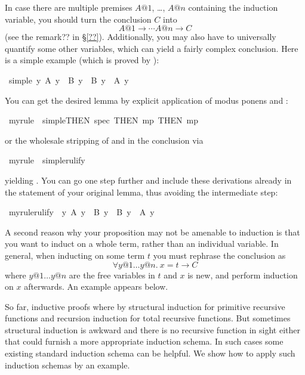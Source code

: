 \begin{isabelle}
\begin{isamarkuptext}
In case there are multiple premises $A@1$, \dots, $A@n$ containing the
induction variable, you should turn the conclusion $C$ into
\[ A@1 \longrightarrow \cdots A@n \longrightarrow C \]
(see the remark?? in \S\ref{??}).
Additionally, you may also have to universally quantify some other variables,
which can yield a fairly complex conclusion.
Here is a simple example (which is proved by ):%
\end{isamarkuptext}%
\ simple{\isacharcolon}\ {\isachardoublequote}{\isasymforall}y{\isachardot}\ A\ y\ {\isasymlongrightarrow}\ B\ y\ {\isasymlongrightarrow}\ B\ y\ {\isacharampersand}\ A\ y{\isachardoublequote}%
\begin{isamarkuptext}%
\noindent
You can get the desired lemma by explicit
application of modus ponens and :%
\end{isamarkuptext}%
\ myrule\ {\isacharequal}\ simple{\isacharbrackleft}THEN\ spec{\isacharcomma}\ THEN\ mp{\isacharcomma}\ THEN\ mp{\isacharbrackright}%
\begin{isamarkuptext}%
\noindent
or the wholesale stripping of \isa{\isasymforall} and
\isa{\isasymlongrightarrow} in the conclusion via %
\end{isamarkuptext}%
\ myrule\ {\isacharequal}\ simple{\isacharbrackleft}rulify{\isacharbrackright}%
\begin{isamarkuptext}%
\noindent
yielding .
You can go one step further and include these derivations already in the
statement of your original lemma, thus avoiding the intermediate step:%
\end{isamarkuptext}%
\ myrule{\isacharbrackleft}rulify{\isacharbrackright}{\isacharcolon}\ \ {\isachardoublequote}{\isasymforall}y{\isachardot}\ A\ y\ {\isasymlongrightarrow}\ B\ y\ {\isasymlongrightarrow}\ B\ y\ {\isacharampersand}\ A\ y{\isachardoublequote}%
\begin{isamarkuptext}%
\bigskip

A second reason why your proposition may not be amenable to induction is that
you want to induct on a whole term, rather than an individual variable. In
general, when inducting on some term $t$ you must rephrase the conclusion as
\[ \forall y@1 \dots y@n.~ x = t \longrightarrow C \] where $y@1 \dots y@n$
are the free variables in $t$ and $x$ is new, and perform induction on $x$
afterwards. An example appears below.%
\end{isamarkuptext}%
%
%
\begin{isamarkuptext}%
So far, inductive proofs where by structural induction for
primitive recursive functions and recursion induction for total recursive
functions. But sometimes structural induction is awkward and there is no
recursive function in sight either that could furnish a more appropriate
induction schema. In such cases some existing standard induction schema can
be helpful. We show how to apply such induction schemas by an example.


\end{isamarkuptext}
\end{isabelle}
